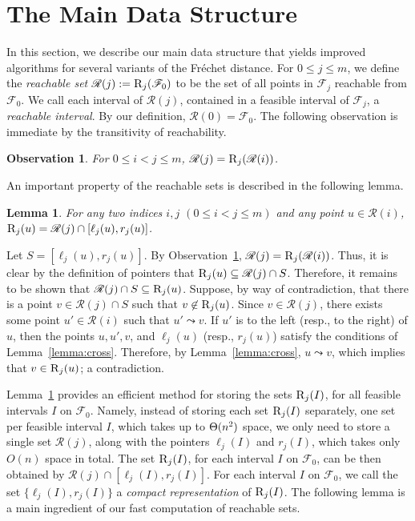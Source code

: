 \documentclass[12pt]{dalthesis}
\def\favoritefont{\bfseries \sffamily}
\def\QED{\ensuremath{{\Box}}}
\def\markatright#1{\leavevmode\unskip\nobreak\quad\hspace*{\fill}{#1}}
\newenvironment{proof}
	{\begin{trivlist}\item[\hskip\labelsep{\favoritefont Proof:}]}
	{\markatright{\QED}\end{trivlist}}
\newtheorem{lemma}[theorem]{Lemma}
\newtheorem{obs}{Observation}
\newcommand{\qed}{}
\newcommand{\lee}{\leqslant}
\newcommand{\set}[1]{{\{ #1 \}}}
\newcommand{\CF}{{\mathscr F}}
\newcommand{\CR}{{\mathscr R}}
\newcommand{\Frechet}{Fr\'echet }
\newcommand{\bigTheta}{{\rm\Theta}}
\newcommand{\F}{\CF}
\newcommand{\R}{\CR}
\newcommand{\RE}{\mbox{\sc R}}
\newcommand{\reach}{\leadsto}
\newcommand{\lp}{\ell}
\newcommand{\rp}{r}
\begin{document}
\section{The Main Data Structure} 
\label{sec:main}

In this section, we describe our main data structure that yields improved algorithms for several variants of the \Frechet distance. 
For $0 \lee j \lee m$, 
we define the \emph{reachable set} $\R(j) := \RE_{j}(\F_0)$
to be the set of all points in $\F_j$ reachable from $\F_0$.  
We call each interval of $\R(j)$,
contained in a feasible interval of $\F_j$,
a \emph{reachable interval}.
By our definition, $\R(0) = \F_0$.
The following observation is immediate by the transitivity of reachability.

\begin{obs} \label{obs:reachable}
	For $0 \lee i < j \lee m$, $\R(j) = \RE_{j}(\R(i))$.
\end{obs}
An important property of the reachable sets is described in the following lemma.

\begin{lemma} \label{lemma:reach}
	For any two indices $i,j$ $(0 \lee i < j \lee m)$ and any point $u \in \R(i)$,
	$\RE_{j}(u) = \R(j) \cap [\lp_j(u), \rp_j(u)]$. 
\end{lemma}

\begin{proof}
	Let $S = [\lp_j(u), \rp_j(u)]$.
	By Observation~\ref{obs:reachable},
	$\R(j) = \RE_{j}(\R(i))$.
	Thus, it is clear by the definition of pointers 
	that $\RE_{j}(u) \subseteq \R(j) \cap S$.
	Therefore, it remains to be shown that $\R(j) \cap S \subseteq \RE_{j}(u)$.
	Suppose, by way of contradiction, that there is a point $v \in \R(j)  \cap S$
	such that $v \not\in \RE_{j}(u)$.
	Since $v \in \R(j)$, there exists some point $u' \in \R(i)$ such that
	$u' \reach v$.
	If $u'$ is to the left (resp., to the right) of $u$, then 
	the points $u, u', v$, and $\lp_j(u)$ (resp., $\rp_j(u)$)
	satisfy the conditions of Lemma~\ref{lemma:cross}.
	Therefore, by Lemma~\ref{lemma:cross}, $u \reach v$,
	which implies that $v \in \RE_{j}(u)$; a contradiction.
	\qed
\end{proof}

Lemma~\ref{lemma:reach} provides an efficient method for storing the sets
$\RE_{j}(I)$, for all feasible intervals $I$ on $\F_0$.
Namely, instead of storing each set $\RE_{j}(I)$ separately,
one set per feasible interval $I$, 
which takes up to $\bigTheta(n^2)$ space,
we only need to store a single set $\R(j)$, 
along with the pointers $\lp_{j}(I)$ and $\rp_{j}(I)$,
which takes only $O(n)$ space in total.
The set $\RE_{j}(I)$, for each interval $I$ on $\F_0$,
can be then obtained by $\R(j) \cap [\lp_j(I), \rp_j(I)]$.
For each interval $I$ on $\F_0$,
we call the set $\set{\lp_j(I), \rp_j(I)}$
a \emph{compact representation} of $\RE_{j}(I)$.
The following lemma is a main ingredient of our fast computation of reachable sets.
\end{document}

